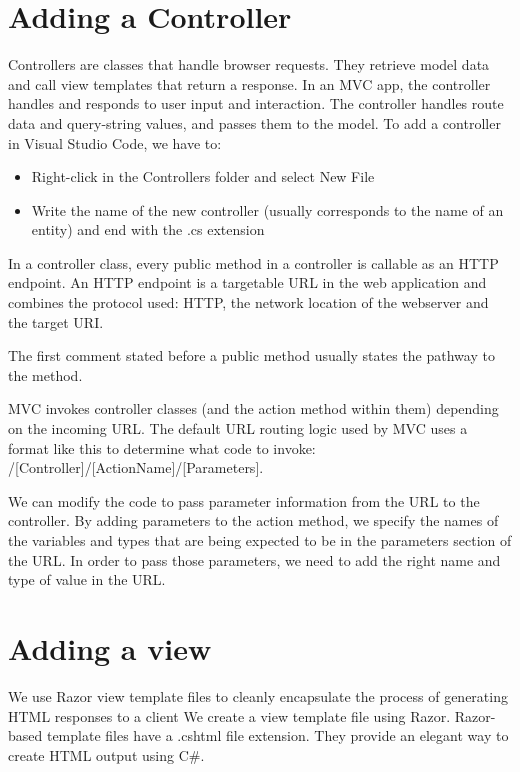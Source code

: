\documentclass{report}
\begin{document}
    \section{Adding a Controller}
    Controllers are classes that handle browser requests. They retrieve model data and call view templates
    that return a response. In an MVC app, the controller handles and responds to user input and interaction.
    The controller handles route data and query-string values, and passes them to the model.
    To add a controller in Visual Studio Code, we have to:
    \begin{itemize}
        \item Right-click in the Controllers folder and select New File
        \item Write the name of the new controller (usually corresponds to the
        name of an entity) and end with the .cs extension
    \end{itemize}
    In a controller class, every public method in a controller is callable as an HTTP endpoint.
    An HTTP endpoint is a targetable URL in the web application and combines the protocol
    used: HTTP, the network location of the webserver and the target URI.

    The first comment stated before a public method usually states the pathway to the method.

    MVC invokes controller classes (and the action method within them) depending on the incoming URL.
    The default URL routing logic used by MVC uses a format like this to determine what code to invoke:
    /[Controller]/[ActionName]/[Parameters].


    We can modify the code to pass parameter information from the URL to the controller.
    By adding parameters to the action method, we specify the names of the variables
    and types that are being expected to be in the parameters section of the URL. In
    order to pass those parameters, we need to add the right name and type of value
    in the URL.

    \section{Adding a view}
    We use Razor view template files to cleanly encapsulate the process
    of generating HTML responses to a client We create a view template file using Razor.
    Razor-based template files have a .cshtml file extension. They provide an elegant way
    to create HTML output using C#.
\end{document}

